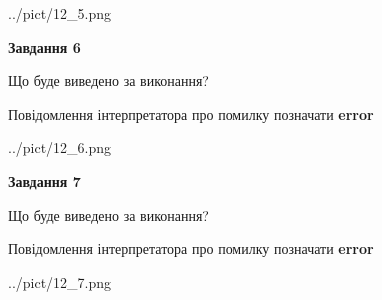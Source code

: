 \documentclass[10pt, ukrainian]{article}
\begin{document}
{\begin {large}
\begin{center}
	{../pict/12_5.png}
\end{center}
\newpage

{\begin {center}\textbf{Завдання 6}\end {center}}\par
Що буде виведено за виконання? \par
Повідомлення інтерпретатора про помилку позначати \textbf{error}

\begin{center}
	{../pict/12_6.png}
\end{center}
\newpage

{\begin {center}\textbf{Завдання 7}\end {center}}\par
Що буде виведено за виконання? \par
Повідомлення інтерпретатора про помилку позначати \textbf{error}

\begin{center}
	{../pict/12_7.png}
\end{center}
\newpage

\end {large}}
\end{document}
